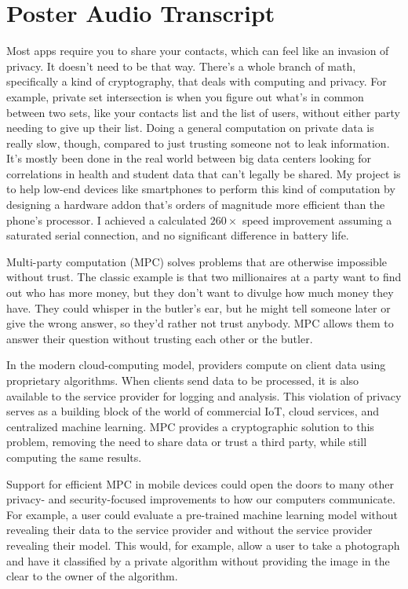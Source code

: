 \documentclass[12pt,letterpaper]{article}
\begin{document}
\pagebreak\pagestyle{plain}

\section{Poster Audio Transcript}
Most apps require you to share your contacts, which can feel like an invasion of privacy. It doesn't need to be that way. There's a whole branch of math, specifically a kind of cryptography, that deals with computing and privacy. For example, private set intersection is when you figure out what's in common between two sets, like your contacts list and the list of users, without either party needing to give up their list. Doing a general computation on private data is really slow, though, compared to just trusting someone not to leak information. It's mostly been done in the real world between big data centers looking for correlations in health and student data that can't legally be shared. My project is to help low-end devices like smartphones to perform this kind of computation by designing a hardware addon that's orders of magnitude more efficient than the phone's processor. I achieved a calculated $260\times$ speed improvement assuming a saturated serial connection, and no significant difference in battery life.

Multi-party computation (MPC) solves problems that are otherwise impossible without trust. The classic example is that two millionaires at a party want to find out who has more money, but they don't want to divulge how much money they have. They could whisper in the butler's ear, but he might tell someone later or give the wrong answer, so they'd rather not trust anybody. MPC allows them to answer their question without trusting each other or the butler.

In the modern cloud-computing model, providers compute on client data using proprietary algorithms. When clients send data to be processed, it is also available to the service provider for logging and analysis. This violation of privacy serves as a building block of the world of commercial IoT, cloud services, and centralized machine learning. MPC provides a cryptographic solution to this problem, removing the need to share data or trust a third party, while still computing the same results.

Support for efficient MPC in mobile devices could open the doors to many other privacy- and security-focused improvements to how our computers communicate. For example, a user could evaluate a pre-trained machine learning model without revealing their data to the service provider and without the service provider revealing their model. This would, for example, allow a user to take a photograph and have it classified by a private algorithm without providing the image in the clear to the owner of the algorithm.
\end{document}
